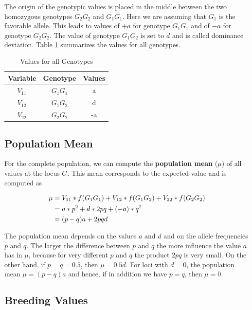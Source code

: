 \documentclass[]{book}
\theoremstyle{definition}
\theoremstyle{definition}
\theoremstyle{definition}
\theoremstyle{remark}
\begin{document}
The origin of the genotypic values is placed in the middle between the two homozygous genotypes \(G_2G_2\) and \(G_1G_1\). Here we are assuming that \(G_1\) is the favorable allele. This leads to values of \(+a\) for genotype \(G_1G_1\) and of \(-a\) for genotype \(G_2G_2\). The value of genotype \(G_1G_2\) is set to \(d\) and is called dominance deviation. Table \ref{tab:tabsumgenvalue} summarizes the values for all genotypes.

\begin{table}

\caption{\label{tab:tabsumgenvalue}Values for all Genotypes}
\centering
\begin{tabular}[t]{ccc}
\toprule
Variable & Genotype & Values\\
\midrule
$V_{11}$ & $G_1G_1$ & a\\
$V_{12}$ & $G_1G_2$ & d\\
$V_{22}$ & $G_2G_2$ & -a\\
\bottomrule
\end{tabular}
\end{table}

\hypertarget{pop-mean}{%
\subsection{Population Mean}\label{pop-mean}}

For the complete population, we can compute the \textbf{population mean} (\(\mu\)) of all values at the locus \(G\). This mean corresponds to the expected value and is computed as

\begin{align}
\mu &= V_{11} * f(G_1G_1) + V_{12} * f(G_1G_2) + V_{22} * f(G_2G_2) \notag \\
    &= a * p^2 + d *2pq + (-a) * q^2 \notag \\
    &= (p-q)a + 2pqd
\label{eq:popmean}
\end{align}

The population mean depends on the values \(a\) and \(d\) and on the allele frequencies \(p\) and \(q\). The larger the difference between \(p\) and \(q\) the more influence the value \(a\) has in \(\mu\), because for very different \(p\) and \(q\) the product \(2pq\) is very small. On the other hand, if \(p=q=0.5\), then \(\mu = 0.5d\). For loci with \(d=0\), the population mean \(\mu = (p-q)a\) and hence, if in addition we have \(p=q\), then \(\mu=0\).

\hypertarget{breed-value}{%
\subsection{Breeding Values}\label{breed-value}}
\end{document}
